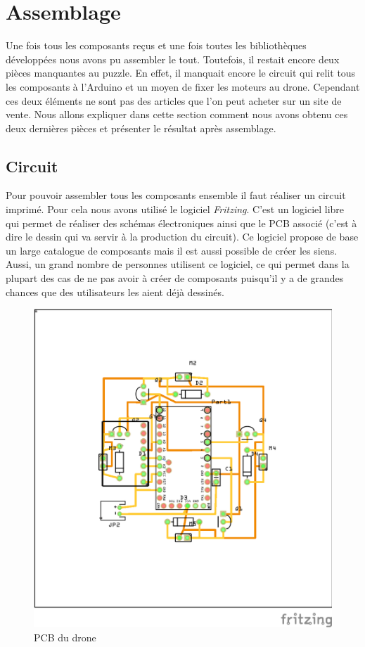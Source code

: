 \documentclass[a4paper,10pt]{report}
\begin{document}
    \section{Assemblage}
      Une fois tous les composants reçus et une fois toutes les bibliothèques 
développées nous avons pu assembler le tout. Toutefois, il restait encore deux 
pièces manquantes au puzzle. En effet, il manquait encore le circuit qui relit 
tous les composants à l'Arduino et un moyen de fixer les moteurs au drone. 
Cependant ces deux éléments ne sont pas des articles que l'on peut acheter sur 
un site de vente. Nous allons expliquer dans cette section comment nous avons 
obtenu ces deux dernières pièces et présenter le résultat après assemblage.

      \subsection{Circuit}
	Pour pouvoir assembler tous les composants ensemble il faut réaliser un 
circuit imprimé. Pour cela nous avons utilisé le logiciel 
\textit{Fritzing}\cite{fritzing}. C'est un logiciel libre qui permet de 
réaliser des schémas électroniques ainsi que le PCB associé (c'est à dire le 
dessin qui va servir à la production du circuit). Ce logiciel propose de base 
un large catalogue de composants mais il est aussi possible de créer les siens. 
Aussi, un grand nombre de personnes utilisent ce logiciel, ce qui permet dans 
la plupart des cas de ne pas avoir à créer de composants puisqu'il y a de 
grandes chances que des utilisateurs les aient déjà dessinés.

      \begin{figure}[htbp]%
	\centering
	\includegraphics[scale = 0.9]{img/nouveau_drone_circuit_pcb.png}
	\caption{PCB du drone}
	\label{pcb1drone}
      \end{figure}
      
\end{document}
